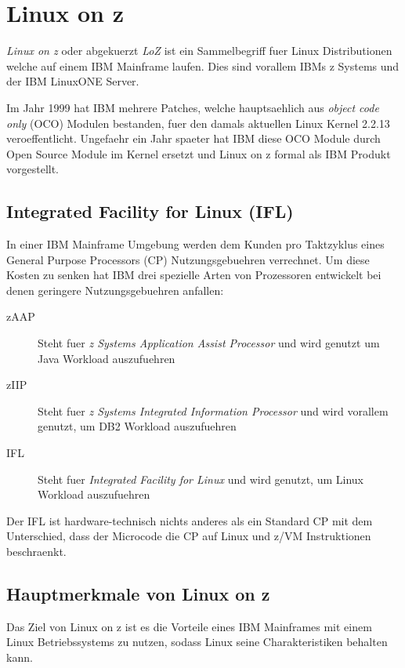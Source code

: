 \chapter{Linux on z}
\label{cha:Linux_on_z}

\textit{Linux on z} oder abgekuerzt \textit{LoZ} ist ein Sammelbegriff fuer Linux Distributionen welche auf einem IBM Mainframe laufen. Dies sind vorallem IBMs z Systems und der IBM LinuxONE Server.\cite{LinuxOnZWiki}

Im Jahr 1999 hat IBM mehrere Patches, welche hauptsaehlich aus \textit{object code only} (OCO) Modulen bestanden, fuer den damals aktuellen Linux Kernel 2.2.13 veroeffentlicht.
Ungefaehr ein Jahr spaeter hat IBM diese OCO Module durch Open Source Module im Kernel ersetzt und Linux on z formal als IBM Produkt vorgestellt.\cite{LinuxOnZWikiHistory}

\section{Integrated Facility for Linux (IFL)}

In einer IBM Mainframe Umgebung werden dem Kunden pro Taktzyklus eines General Purpose Processors (CP) Nutzungsgebuehren verrechnet.
Um diese Kosten zu senken hat IBM drei spezielle Arten von Prozessoren entwickelt bei denen geringere Nutzungsgebuehren anfallen:
\begin{description}
    \item[zAAP]{Steht fuer \textit{z Systems Application Assist Processor} und wird genutzt um Java Workload auszufuehren\cite{IBMzAAP}}
    \item[zIIP]{Steht fuer \textit{z Systems Integrated Information Processor} und wird vorallem genutzt, um DB2 Workload auszufuehren\cite{IBMzIIP}}
    \item[IFL]{Steht fuer \textit{Integrated Facility for Linux} und wird genutzt, um Linux Workload auszufuehren\cite{IBMIFL}}
\end{description}
Der IFL ist hardware-technisch nichts anderes als ein Standard CP mit dem Unterschied, dass der Microcode die CP auf Linux und z/VM Instruktionen beschraenkt.

\section{Hauptmerkmale von Linux on z}

Das Ziel von Linux on z ist es die Vorteile eines IBM Mainframes mit einem Linux Betriebssystems zu nutzen, sodass Linux seine Charakteristiken behalten kann.

